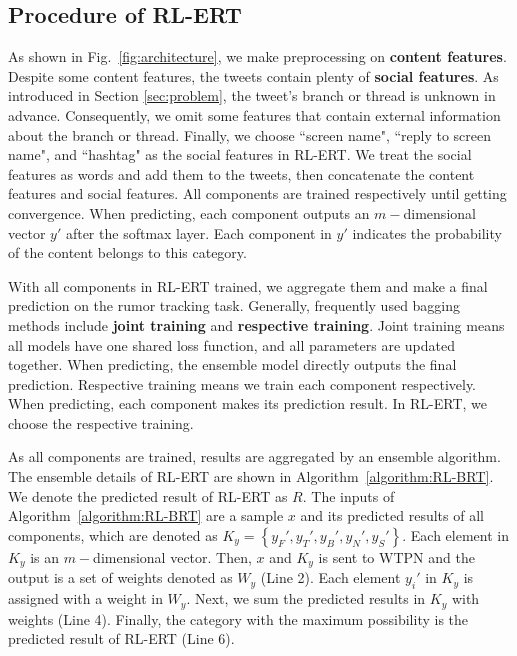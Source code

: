 \subsection{Procedure of RL-ERT}
As shown in Fig.~\ref{fig:architecture}, we make preprocessing on \textbf{content features}. Despite some content features, the tweets contain plenty of \textbf{social features}. As introduced in Section \ref{sec:problem}, the tweet's branch or thread is unknown in advance. Consequently, we omit some features that contain external information about the branch or thread. Finally, we choose ``screen name", ``reply to screen name", and ``hashtag" as the social features in RL-ERT. We treat the social features as words and add them to the tweets, then concatenate the content features and social features. All components are trained respectively until getting convergence. When predicting, each component outputs an $m-$dimensional vector $y'$ after the softmax layer. Each component in $y'$ indicates the probability of the content belongs to this category. 

With all components in RL-ERT trained, we aggregate them and make a final prediction on the rumor tracking task. Generally, frequently used bagging methods include \textbf{joint training} and \textbf{respective training}. Joint training means all models have one shared loss function, and all parameters are updated together. When predicting, the ensemble model directly outputs the final prediction. Respective training means we train each component respectively. When predicting, each component makes its prediction result. In RL-ERT, we choose the respective training. 

As all components are trained, results are aggregated by an ensemble algorithm. The ensemble details of RL-ERT are shown in Algorithm~\ref{algorithm:RL-BRT}. We denote the predicted result of RL-ERT as $R$. The inputs of Algorithm~\ref{algorithm:RL-BRT} are a sample $x$ and its predicted results of all components, which are denoted as $K_y = \left\{y_F', y_T', y_B', y_N', y_S' \right\}$. Each element in $K_y$ is an $m-$dimensional vector. Then, $x$ and $K_y$ is sent to WTPN and the output is a set of weights denoted as $W_y$ (Line 2). Each element $y_i'$ in $K_y$ is assigned with a weight in $W_y$. Next, we sum the predicted results in $K_y$ with weights (Line 4). Finally, the category with the maximum possibility is the predicted result of RL-ERT (Line 6). 

